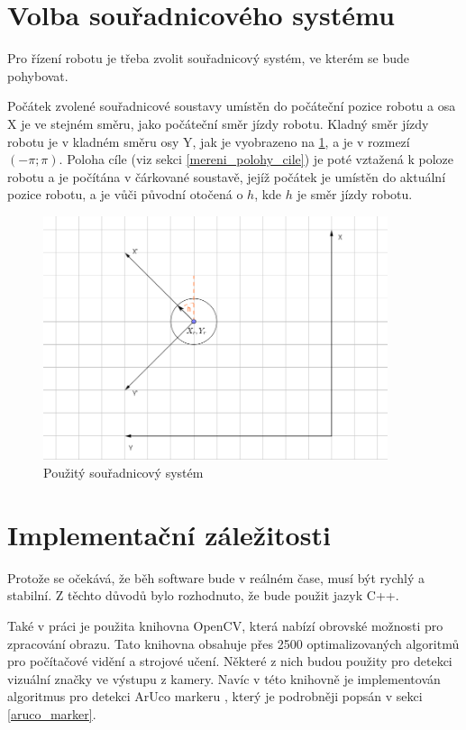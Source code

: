 \documentclass[twoside]{ctuthesis}
\theoremstyle{plain}
\theoremstyle{definition}
\theoremstyle{note}
\begin{document}
\section{Volba souřadnicového systému}
\label{ss_section}

Pro řízení robotu je třeba zvolit souřadnicový systém, ve kterém se bude pohybovat.

Počátek zvolené souřadnicové soustavy umístěn do počáteční pozice robotu a osa X je ve stejném směru, jako počáteční směr jízdy robotu. Kladný směr jízdy robotu je v kladném směru osy Y, jak je vyobrazeno na \ref{ss}, a je v rozmezí $\left(-\pi; \pi\right)$. Poloha cíle (viz sekci \ref{mereni_polohy_cile}) je poté vztažená k poloze robotu a je počítána v čárkované soustavě, jejíž počátek je umístěn do aktuální pozice robotu, a je vůči původní otočená o $h$, kde $h$ je směr jízdy robotu.


\begin{figure}[H]
	\caption{Použitý souřadnicový systém}
	
	\label{ss}
	\includegraphics[width=0.9\textwidth]{images/2/ss.png}
\end{figure}
\section{Implementační záležitosti}


Protože se očekává, že běh software bude v reálném čase, musí být rychlý a stabilní. Z těchto důvodů bylo rozhodnuto, že bude použit jazyk C++.

Také v práci je použita knihovna OpenCV\cite{cite:4}, která nabízí obrovské možnosti pro zpracování obrazu. Tato knihovna obsahuje přes 2500 optimalizovaných algoritmů pro počítačové vidění a strojové učení. Některé z nich budou použity pro detekci vizuální značky ve výstupu z kamery. Navíc v této knihovně je implementován algoritmus pro detekci ArUco markeru \cite{cite:1}, který je podrobněji popsán v sekci \ref{aruco_marker}.
\end{document}
